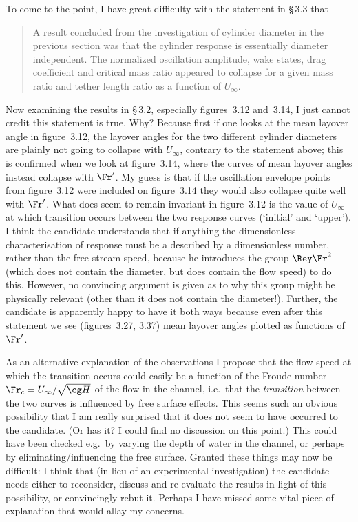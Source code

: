 \documentclass[12pt,twoside]{letter}
\begin{document}
To come to the point, I have great difficulty with the statement in
\S\,3.3 that
\begin{quote}
A result concluded from the investigation of cylinder diameter in the
previous section was that the cylinder response is essentially
diameter independent. The normalized oscillation amplitude, wake
states, drag coefficient and critical mass ratio appeared to collapse
for a given mass ratio and tether length ratio as a function of
$U_\infty$.
\end{quote}
Now examining the results in \S\,3.2, especially figures~3.12
and~3.14, I just cannot credit this statement is true. Why? Because
first if one looks at the mean layover angle in figure~3.12, the
layover angles for the two different cylinder diameters are plainly
not going to collapse with $U_\infty$, contrary to the statement
above; this is confirmed when we look at figure~3.14, where the curves
of mean layover angles instead collapse with $\Fr^\prime$.  My guess
is that if the oscillation envelope points from figure~3.12 were
included on figure~3.14 they would also collapse quite well with
$\Fr^\prime$.  What does seem to remain invariant in figure~3.12 is
the value of $U_\infty$ at which transition occurs between the two
response curves (`initial' and `upper').  I think the candidate
understands that if anything the dimensionless characterisation of
response must be a described by a dimensionless number, rather than
the free-stream speed, because he introduces the group $\Rey\Fr^2$
(which does not contain the diameter, but does contain the flow speed)
to do this. However, no convincing argument is given as to why this
group might be physically relevant (other than it does not contain the
diameter!).  Further, the candidate is apparently happy to have it
both ways because even after this statement we see (figures~3.27,
3.37) mean layover angles plotted as functions of $\Fr^\prime$.

As an alternative explanation of the observations I propose that the
flow speed at which the transition occurs could easily be a function
of the Froude number $\Fr_c=U_\infty/\sqrt{\cg H}$ of the flow in the
channel, i.e.\ that the \emph{transition} between the two curves is
influenced by free surface effects.  This seems such an obvious
possibility that I am really surprised that it does not seem to have
occurred to the candidate. (Or has it? I could find no discussion on
this point.)  This could have been checked e.g.\ by varying the depth
of water in the channel, or perhaps by eliminating/influencing the
free surface. Granted these things may now be difficult: I think that
(in lieu of an experimental investigation) the candidate needs either
to reconsider, discuss and re-evaluate the results in light of this
possibility, or convincingly rebut it. Perhaps I have missed some
vital piece of explanation that would allay my concerns.
\end{document}
